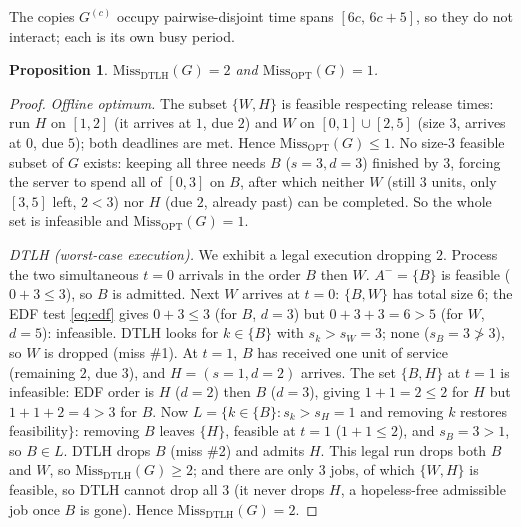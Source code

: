 \documentclass{amsart}
\newtheorem{proposition}[theorem]{Proposition}
\theoremstyle{definition}
\begin{document}
The copies $G^{(c)}$ occupy pairwise-disjoint time spans
$[6c,\,6c+5]$, so they do not interact; each is its own busy period.

\begin{proposition}\label{prop:gadget}
$\mathrm{Miss}_{\mathrm{DTLH}}(G)=2$ and $\mathrm{Miss}_{\mathrm{OPT}}(G)=1$.
\end{proposition}

\begin{proof}
\emph{Offline optimum.} The subset $\{W,H\}$ is feasible respecting release
times: run $H$ on $[1,2]$ (it arrives at $1$, due $2$) and $W$ on
$[0,1]\cup[2,5]$ (size $3$, arrives at $0$, due $5$); both deadlines are met.
Hence $\mathrm{Miss}_{\mathrm{OPT}}(G)\le 1$. No size-$3$ feasible subset of $G$
exists: keeping all three needs $B$ ($s=3,d=3$) finished by $3$, forcing the
server to spend all of $[0,3]$ on $B$, after which neither $W$ (still $3$ units,
only $[3,5]$ left, $2<3$) nor $H$ (due $2$, already past) can be completed. So
the whole set is infeasible and $\mathrm{Miss}_{\mathrm{OPT}}(G)=1$.

\emph{DTLH (worst-case execution).} We exhibit a legal execution dropping $2$.
Process the two simultaneous $t=0$ arrivals in the order $B$ then $W$.
$A^-=\{B\}$ is feasible ($0+3\le 3$), so $B$ is admitted. Next $W$ arrives at
$t=0$: $\{B,W\}$ has total size $6$; the EDF test \eqref{eq:edf} gives $0+3\le 3$
(for $B$, $d=3$) but $0+3+3=6>5$ (for $W$, $d=5$): infeasible. DTLH looks for
$k\in\{B\}$ with $s_k>s_W=3$; none ($s_B=3\not>3$), so $W$ is dropped (miss
\#1). At $t=1$, $B$ has received one unit of service (remaining $2$, due $3$),
and $H=(s{=}1,d{=}2)$ arrives. The set $\{B,H\}$ at $t=1$ is infeasible: EDF
order is $H$ ($d=2$) then $B$ ($d=3$), giving $1+1=2\le2$ for $H$ but
$1+1+2=4>3$ for $B$. Now $L=\{k\in\{B\}: s_k>s_H=1$ and removing $k$ restores
feasibility$\}$: removing $B$ leaves $\{H\}$, feasible at $t=1$ ($1+1\le 2$), and
$s_B=3>1$, so $B\in L$. DTLH drops $B$ (miss \#2) and admits $H$. This legal run
drops both $B$ and $W$, so $\mathrm{Miss}_{\mathrm{DTLH}}(G)\ge 2$; and there are
only $3$ jobs, of which $\{W,H\}$ is feasible, so DTLH cannot drop all $3$ (it
never drops $H$, a hopeless-free admissible job once $B$ is gone). Hence
$\mathrm{Miss}_{\mathrm{DTLH}}(G)=2$.
\end{proof}
\end{document}
